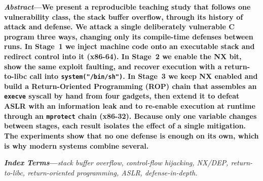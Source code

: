 \documentclass[10pt,twocolumn,letterpaper]{article}
\newcommand{\code}[1]{\texttt{\small #1}}
\begin{document}

\noindent\textbf{\textit{Abstract}---We present a reproducible teaching study
that follows one vulnerability class, the stack buffer overflow, through its
history of attack and defense. We attack a single deliberately vulnerable C
program three ways, changing only its compile-time defenses between runs. In
Stage~1 we inject machine code onto an executable stack and redirect control
into it (x86-64). In Stage~2 we enable the NX bit, show the same exploit
faulting, and recover execution with a return-to-libc call into
\code{system("/bin/sh")}. In Stage~3 we keep NX enabled and build a
Return-Oriented Programming (ROP) chain that assembles an \code{execve} syscall
by hand from four gadgets, then extend it to defeat ASLR with an information
leak and to re-enable execution at runtime through an \code{mprotect} chain
(x86-32). Because only one variable changes between stages, each result isolates
the effect of a single mitigation. The experiments show that no one defense is
enough on its own, which is why modern systems combine several.}

\vspace{4pt}
\noindent\textbf{\textit{Index Terms}---}\textit{stack buffer overflow,
control-flow hijacking, NX/DEP, return-to-libc, return-oriented programming,
ASLR, defense-in-depth.}
\vspace{6pt}

\end{document}
